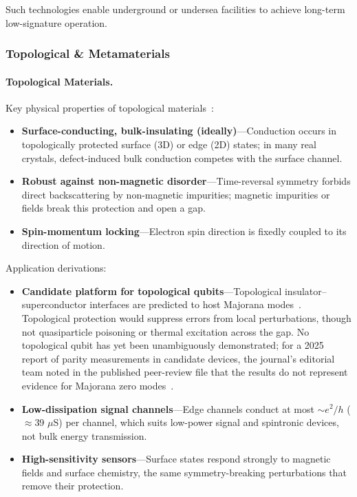 \documentclass[aps,prd,twocolumn,superscriptaddress,nofootinbib]{revtex4-2}
\begin{document}
Such technologies enable underground or undersea facilities to achieve long-term low-signature operation.

\subsubsection{Topological \& Metamaterials}\label{sec:topo-meta}

\paragraph{Topological Materials.}

Key physical properties of topological materials~\cite{Hasan2010}:

\begin{itemize}
  \item \textbf{Surface-conducting, bulk-insulating (ideally)}---Conduction occurs in topologically protected surface (3D) or edge (2D) states; in many real crystals, defect-induced bulk conduction competes with the surface channel.
  \item \textbf{Robust against non-magnetic disorder}---Time-reversal symmetry forbids direct backscattering by non-magnetic impurities; magnetic impurities or fields break this protection and open a gap.
  \item \textbf{Spin-momentum locking}---Electron spin direction is fixedly coupled to its direction of motion.
\end{itemize}

Application derivations:

\begin{itemize}
  \item \textbf{Candidate platform for topological qubits}---Topological insulator--superconductor interfaces are predicted to host Majorana modes~\cite{Hasan2010}. Topological protection would suppress errors from local perturbations, though not quasiparticle poisoning or thermal excitation across the gap. No topological qubit has yet been unambiguously demonstrated; for a 2025 report of parity measurements in candidate devices, the journal's editorial team noted in the published peer-review file that the results do not represent evidence for Majorana zero modes~\cite{MicrosoftQuantum2025}.
  \item \textbf{Low-dissipation signal channels}---Edge channels conduct at most ${\sim}e^{2}/h$ ($\approx$39 $\mu$S) per channel, which suits low-power signal and spintronic devices, not bulk energy transmission.
  \item \textbf{High-sensitivity sensors}---Surface states respond strongly to magnetic fields and surface chemistry, the same symmetry-breaking perturbations that remove their protection.
\end{itemize}
\end{document}
